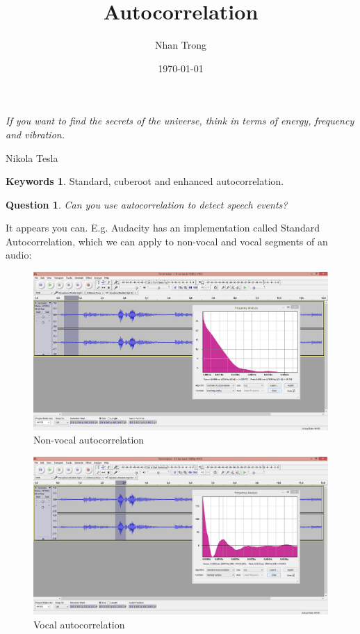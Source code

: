 \documentclass[12pt]{article}
\title{Autocorrelation}
\author{Nhan Trong}
\date{\today}                                           %
\theoremstyle{plain}
\newtheorem{question}[theorem]{Question}
\theoremstyle{definition}
\newtheorem*{keywords}{Keywords}
\theoremstyle{remark}
\begin{document}
\maketitle

\epigraph{\textit{If you want to find the secrets of the universe, think in terms of energy, frequency and vibration.}}{Nikola Tesla}

\begin{keywords}
Standard, cuberoot and enhanced autocorrelation.
\end{keywords}

\begin{question}
Can you use autocorrelation to detect speech events?
\end{question}

It appears you can. E.g. Audacity has an implementation called Standard Autocorrelation, which we can apply to non-vocal and vocal segments of an audio:

\begin{figure}[H]
\centering
\includegraphics[width=1.0\textwidth]{autocorrelation1}
\caption{Non-vocal autocorrelation}
\end{figure}

\begin{figure}[H]
\centering
\includegraphics[width=1.0\textwidth]{autocorrelation2}
\caption{Vocal autocorrelation}
\end{figure}
\end{document}

